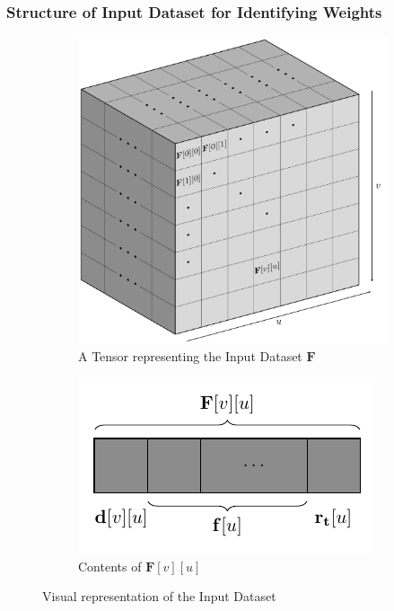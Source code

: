 \documentclass[12pt]{article}
\newcommand{\matr}[1]{\mathbf{#1}}  %
\begin{document}
    \subsubsection{Structure of Input Dataset for Identifying Weights} \label{sec:Structure of Input Dataset for Identifying Weights}
    \begin{figure}[H]
        \begin{subfigure}{.64\textwidth}
            \centering
            \includegraphics[width=\linewidth]{weights_input_dataset}
            \caption{A Tensor representing the Input Dataset $\matr{F}$}
            \label{fig:A Tensor representing the complete Input Dataset}
        \end{subfigure}
        \begin{subfigure}{.35\textwidth}
            \centering
            \includegraphics[width=\linewidth]{zoomup_Fuv}
            \caption{Contents of $\matr{F}[v][u]$}
            \label{fig:Zoomed-in contents of Fvu}
        \end{subfigure}
        \caption{Visual representation of the Input Dataset}
        \label{fig:Visual representation of the Input Dataset}
    \end{figure}
\end{document}
